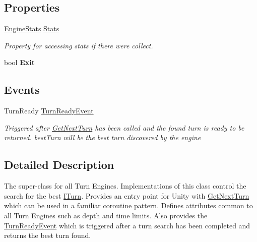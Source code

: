 \subsection*{Properties}
\begin{DoxyCompactItemize}
\item 
\hyperlink{class_universal_turn_based_a_i_1_1_engine_stats}{Engine\+Stats} \hyperlink{class_universal_turn_based_a_i_1_1_turn_engine_a2588f0e4a11f2c96613e72c890e39138}{Stats}
\begin{DoxyCompactList}\small\item\em Property for accessing stats if there were collect. \end{DoxyCompactList}\item 
\hypertarget{class_universal_turn_based_a_i_1_1_turn_engine_aa96090059f46e1c54a9e7edde40c9f2d}{}bool {\bfseries Exit}\label{class_universal_turn_based_a_i_1_1_turn_engine_aa96090059f46e1c54a9e7edde40c9f2d}

\end{DoxyCompactItemize}
\subsection*{Events}
\begin{DoxyCompactItemize}
\item 
Turn\+Ready \hyperlink{class_universal_turn_based_a_i_1_1_turn_engine_af10115494121382d2966a8fc9fe4c9a0}{Turn\+Ready\+Event}
\begin{DoxyCompactList}\small\item\em Triggered after \hyperlink{class_universal_turn_based_a_i_1_1_turn_engine_ad1a07e70064e2f188b65a783aa49cd8a}{Get\+Next\+Turn} has been called and the found turn is ready to be returned. best\+Turn will be the best turn discovered by the engine \end{DoxyCompactList}\end{DoxyCompactItemize}


\subsection{Detailed Description}
The super-\/class for all Turn Engines. Implementations of this class control the search for the best \hyperlink{interface_universal_turn_based_a_i_1_1_i_turn}{I\+Turn}. Provides an entry point for Unity with \hyperlink{class_universal_turn_based_a_i_1_1_turn_engine_ad1a07e70064e2f188b65a783aa49cd8a}{Get\+Next\+Turn} which can be used in a familiar coroutine pattern. Defines attributes common to all Turn Engines such as depth and time limits. Also provides the \hyperlink{class_universal_turn_based_a_i_1_1_turn_engine_af10115494121382d2966a8fc9fe4c9a0}{Turn\+Ready\+Event} which is triggered after a turn search has been completed and returns the best turn found. 

